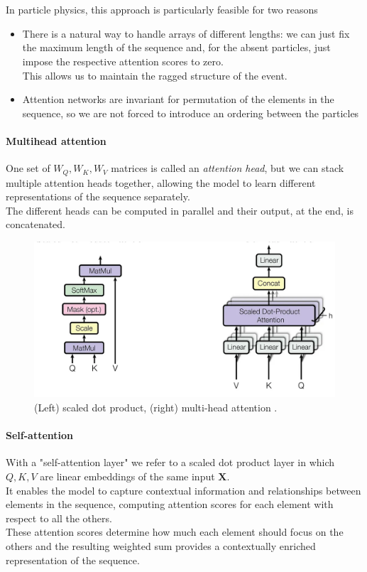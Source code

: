 \\
\\
In particle physics, this approach is particularly feasible for two reasons
\begin{itemize}
    \item There is a natural way to handle arrays of different lengths: we can just fix the maximum length of the sequence and, for the absent particles, just impose the respective attention scores to zero.\\
    This allows us to maintain the ragged structure of the event.
    \item Attention networks are invariant for permutation of the elements in the sequence, so we are not forced to introduce an ordering between the particles
\end{itemize}


\paragraph*{Multihead attention}
One set of $W_Q,W_K,W_V$ matrices is called an \textit{attention head}, but we can stack multiple attention heads together, allowing the model to learn different representations of the sequence separately.\\
The different heads can be computed in parallel and their output, at the end, is concatenated.

\begin{figure}[h!]
    \centering
    \includegraphics[width=0.75\linewidth]{fig//chap05-stats/multihead_attention.png}
    \caption{(Left) scaled dot product, (right) multi-head attention \cite{Vaswani2017AttentionNeed}.}
    \label{fig:multihead}
\end{figure}

\paragraph*{Self-attention} With a "self-attention layer" we refer to a scaled dot product layer in which $Q,K,V$ are linear embeddings of the same input $\bm{X}$.\\
It enables the model to capture contextual information and relationships between elements in the sequence, computing attention scores for each element with respect to all the others.\\
These attention scores determine how much each element should focus on the others and the resulting weighted sum provides a contextually enriched representation of the sequence.

